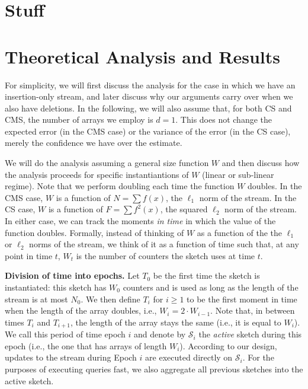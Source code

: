 \documentclass[sigconf]{acmart}
\begin{document}
\section{Stuff}



\section{Theoretical Analysis and Results}\label{sec:theoretical_analysis_and_results}

\newcommand{\POECMS}{\mathsf{PoE_{CMS}}}
\renewcommand{\Pr}[1]{{\mathrm{Pr}}\left[ #1 \right]}
\newcommand{\parentheses}[1]{\left(#1\right)}
\newcommand{\expectation}[1]{\mathsf{E}\left[ #1 \right]}
\newcommand{\variance}[1]{\textsf{Var}\left[ #1 \right]}





For simplicity, we will first discuss the analysis for the case in which we have an insertion-only stream, and later discuss why our arguments carry over when we also have deletions. In the following, we will also assume that, for both CS and CMS, the number of arrays we employ is $d=1$. This does not change the expected error (in the CMS case) or the variance of the error (in the CS case),  merely the confidence we have over the estimate.

We will do the analysis assuming a general size function $W$ and then discuss how the analysis proceeds for specific instantiantions of  $W$ (linear or sub-linear regime). Note that we perform doubling each time the function $W$ doubles. In the CMS case, $W$ is a function of $N = \sum f(x)$, the $\ell_1$ norm of the stream. In the CS case,  $W$ is a function of $F = \sum f^2(x)$, the squared $\ell_2$ norm of the stream. In either case, we can track the moments \emph{in time} in which the value of the function doubles. Formally, instead of thinking of $W$ as a function of the the $\ell_1$ or $\ell_2$ norms of the stream, we think of it as a function of time such that, at any point in time $t$, $W_t$ is the number of counters the sketch uses at time $t$.

\medskip\noindent
\textbf{Division of time into epochs.} Let $T_0$ be the first time the sketch is instantiated: this sketch has $W_0$ counters and is used as long as the length of the stream is at most $N_0$. 
We then define $T_i$ for $i\geq 1$ to be the first moment in time when the length of the array doubles, i.e., $W_i = 2\cdot W_{i-1}$. Note that, in between times $T_{i}$ and $T_{i+1}$, the length of the array stays the same (i.e., it is equal to $W_i$). We call this period of time epoch $i$ and denote by $\mathcal{S}_{i}$ the \emph{active} sketch during this epoch (i.e., the one that has arrays of length $W_i$). According to our design, updates to the stream during Epoch $i$ are executed directly on $\mathcal{S}_{i}$. For the purposes of executing queries fast, we also aggregate all previous sketches into the active sketch. 	
\end{document}

